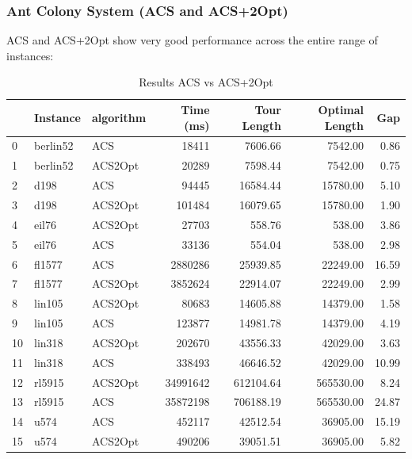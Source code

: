 \subsubsection{Ant Colony System (ACS and ACS+2Opt)}
ACS and ACS+2Opt show very good performance across the entire range of instances:


\begin{table}[H]
	\centering
	\caption{Results ACS vs ACS+2Opt}
	\begin{tabular}{lllrrrr}
		\toprule
		   & Instance & algorithm & Time (ms) & Tour Length & Optimal Length & Gap   \\
		\midrule
		0  & berlin52 & ACS       & 18411      & 7606.66        & 7542.00          & 0.86  \\
		1  & berlin52 & ACS2Opt   & 20289      & 7598.44        & 7542.00          & 0.75  \\
		2  & d198     & ACS       & 94445      & 16584.44       & 15780.00         & 5.10  \\
		3  & d198     & ACS2Opt   & 101484     & 16079.65       & 15780.00         & 1.90  \\
		4  & eil76    & ACS2Opt   & 27703      & 558.76         & 538.00           & 3.86  \\
		5  & eil76    & ACS       & 33136      & 554.04         & 538.00           & 2.98  \\
		6  & fl1577   & ACS       & 2880286    & 25939.85       & 22249.00         & 16.59 \\
		7  & fl1577   & ACS2Opt   & 3852624    & 22914.07       & 22249.00         & 2.99  \\
		8  & lin105   & ACS2Opt   & 80683      & 14605.88       & 14379.00         & 1.58  \\
		9  & lin105   & ACS       & 123877     & 14981.78       & 14379.00         & 4.19  \\
		10 & lin318   & ACS2Opt   & 202670     & 43556.33       & 42029.00         & 3.63  \\
		11 & lin318   & ACS       & 338493     & 46646.52       & 42029.00         & 10.99 \\
		12 & rl5915   & ACS2Opt   & 34991642   & 612104.64      & 565530.00        & 8.24  \\
		13 & rl5915   & ACS       & 35872198   & 706188.19      & 565530.00        & 24.87 \\
		14 & u574     & ACS       & 452117     & 42512.54       & 36905.00         & 15.19 \\
		15 & u574     & ACS2Opt   & 490206     & 39051.51       & 36905.00         & 5.82  \\
		\bottomrule
	\end{tabular}
\end{table}

